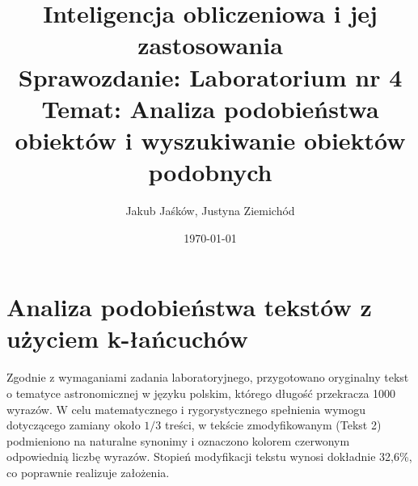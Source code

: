 \documentclass[12pt,a4paper]{article}
\title{Inteligencja obliczeniowa i jej zastosowania \\ 
\large Sprawozdanie: Laboratorium nr 4 \\
\small Temat: Analiza podobieństwa obiektów i wyszukiwanie obiektów podobnych}
\author{Jakub Jaśków, Justyna Ziemichód}
\date{\today}
\begin{document}
\maketitle

\section{Analiza podobieństwa tekstów z użyciem k-łańcuchów}

Zgodnie z wymaganiami zadania laboratoryjnego, przygotowano oryginalny tekst o tematyce astronomicznej w języku polskim, którego długość przekracza 1000 wyrazów. W celu matematycznego i rygorystycznego spełnienia wymogu dotyczącego zamiany około $1/3$ treści, w tekście zmodyfikowanym (Tekst 2) podmieniono na naturalne synonimy i oznaczono kolorem czerwonym odpowiednią liczbę wyrazów. Stopień modyfikacji tekstu wynosi dokładnie 32,6\%, co poprawnie realizuje założenia.
\end{document}
